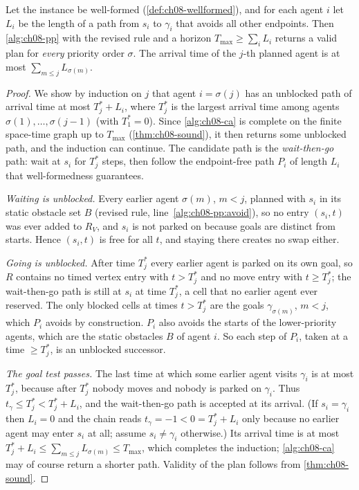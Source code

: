\begin{theorem}
\label{thm:ch08-wellformed}
Let the instance be well-formed (\cref{def:ch08-wellformed}), and for each agent $i$
let $L_i$ be the length of a path from $s_i$ to $\gamma_i$ that avoids all other endpoints.
Then \cref{alg:ch08-pp} with the revised rule and a horizon $T_{\max} \ge \sum_i L_i$
returns a valid plan for \emph{every} priority order $\sigma$. The arrival time of the
$j$-th planned agent is at most $\sum_{m \le j} L_{\sigma(m)}$.
\end{theorem}
\begin{proof}
We show by induction on $j$ that agent $i = \sigma(j)$ has an unblocked path of arrival
time at most $T^*_j + L_i$, where $T^*_j$ is the largest arrival time among agents
$\sigma(1), \dots, \sigma(j-1)$ (with $T^*_1 = 0$). Since \cref{alg:ch08-ca} is
complete on the finite space-time graph up to $T_{\max}$ (\cref{thm:ch08-sound}), it
then returns some unblocked path, and the induction can continue. The candidate path is
the \emph{wait-then-go} path: wait at $s_i$ for $T^*_j$ steps, then follow the
endpoint-free path $P_i$ of length $L_i$ that well-formedness guarantees.

\emph{Waiting is unblocked.} Every earlier agent $\sigma(m)$, $m < j$, planned with
$s_i$ in its static obstacle set $B$ (revised rule, line~\ref{alg:ch08-pp:avoid}), so
no entry $(s_i, t)$ was ever added to $R_V$, and $s_i$ is not parked on because goals
are distinct from starts. Hence $(s_i, t)$ is free for all $t$, and staying there
creates no swap either.

\emph{Going is unblocked.} After time $T^*_j$ every earlier agent is parked on its own
goal, so $R$ contains no timed vertex entry with $t > T^*_j$ and no move entry with
$t \ge T^*_j$; the wait-then-go path is still at $s_i$ at time $T^*_j$, a cell that no
earlier agent ever reserved. The only blocked cells at times $t > T^*_j$ are the goals
$\gamma_{\sigma(m)}$, $m < j$, which $P_i$ avoids by construction. $P_i$ also avoids the starts of the lower-priority agents, which are the
static obstacles $B$ of agent $i$. So each step of $P_i$, taken at a time $\ge T^*_j$,
is an unblocked successor.

\emph{The goal test passes.} The last time at which some earlier agent visits $\gamma_i$ is
at most $T^*_j$, because after $T^*_j$ nobody moves and nobody is parked on $\gamma_i$. Thus
$t_\gamma \le T^*_j < T^*_j + L_i$, and the wait-then-go path is accepted at its arrival.
(If $s_i = \gamma_i$ then $L_i = 0$ and the chain reads $t_\gamma = -1 < 0 = T^*_j + L_i$ only
because no earlier agent may enter $s_i$ at all; assume $s_i \ne \gamma_i$ otherwise.)
Its arrival time is at most $T^*_j + L_i \le \sum_{m \le j} L_{\sigma(m)} \le T_{\max}$,
which completes the induction; \cref{alg:ch08-ca} may of course return a shorter path.
Validity of the plan follows from \cref{thm:ch08-sound}. \qedhere
\end{proof}

